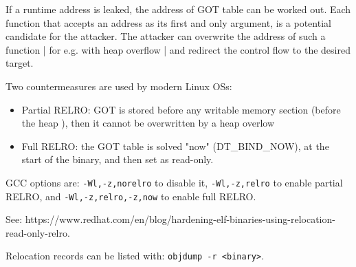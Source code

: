 If a runtime address is leaked, the address of GOT table can be worked out.
Each function that accepts an address as its first and only argument, is a potential candidate for the attacker.
The attacker can overwrite the address of such a function | for e.g. with heap overflow | and redirect the control flow to the desired target.

Two countermeasures are used by modern Linux OSs:
\begin{itemize}
  \item Partial RELRO: GOT is stored before any writable memory section (before the heap ), then it cannot be overwritten by a heap overlow
  \item Full RELRO: the GOT table is solved "now" (DT_BIND_NOW), at the start of the binary, and then set as read-only.
\end{itemize}

GCC options are: \texttt{-Wl,-z,norelro} to disable it, \texttt{-Wl,-z,relro} to enable partial RELRO, and \texttt{-Wl,-z,relro,-z,now} to enable full RELRO.

See: https://www.redhat.com/en/blog/hardening-elf-binaries-using-relocation-read-only-relro.

Relocation records can be listed with: \texttt{objdump -r <binary>}.